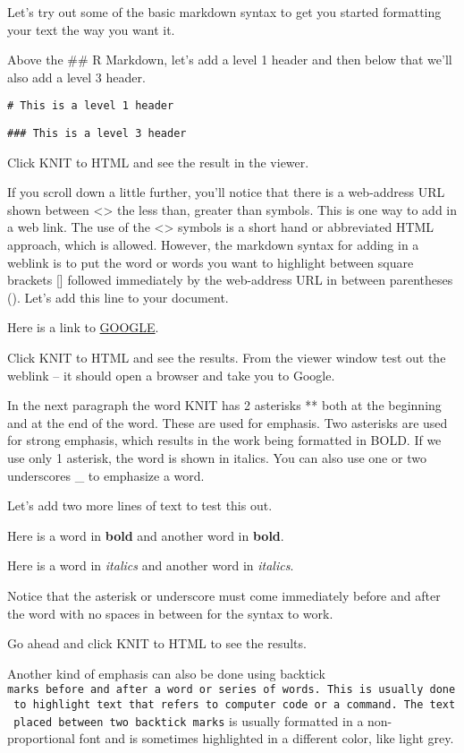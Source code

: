 \documentclass[]{book}
\theoremstyle{definition}
\theoremstyle{definition}
\theoremstyle{definition}
\theoremstyle{remark}
\begin{document}
Let's try out some of the basic markdown syntax to get you started
formatting your text the way you want it.

Above the \#\# R Markdown, let's add a level 1 header and then below
that we'll also add a level 3 header.

\texttt{\#\ This\ is\ a\ level\ 1\ header}

\texttt{\#\#\#\ This\ is\ a\ level\ 3\ header}

Click KNIT to HTML and see the result in the viewer.

If you scroll down a little further, you'll notice that there is a
web-address URL shown between \textless{}\textgreater{} the less than,
greater than symbols. This is one way to add in a web link. The use of
the \textless{}\textgreater{} symbols is a short hand or abbreviated
HTML approach, which is allowed. However, the markdown syntax for adding
in a weblink is to put the word or words you want to highlight between
square brackets {[}{]} followed immediately by the web-address URL in
between parentheses (). Let's add this line to your document.

Here is a link to \href{http://google.com}{GOOGLE}.

Click KNIT to HTML and see the results. From the viewer window test out
the weblink -- it should open a browser and take you to Google.

In the next paragraph the word KNIT has 2 asterisks ** both at the
beginning and at the end of the word. These are used for emphasis. Two
asterisks are used for strong emphasis, which results in the work being
formatted in BOLD. If we use only 1 asterisk, the word is shown in
italics. You can also use one or two underscores \_ to emphasize a word.

Let's add two more lines of text to test this out.

Here is a word in \textbf{bold} and another word in \textbf{bold}.

Here is a word in \emph{italics} and another word in \emph{italics}.

Notice that the asterisk or underscore must come immediately before and
after the word with no spaces in between for the syntax to work.

Go ahead and click KNIT to HTML to see the results.

Another kind of emphasis can also be done using backtick
\texttt{marks\ before\ and\ after\ a\ word\ or\ series\ of\ words.\ This\ is\ usually\ done\ to\ highlight\ text\ that\ refers\ to\ computer\ code\ or\ a\ command.\ The\ text\ placed\ between\ two\ backtick\ marks}
is usually formatted in a non-proportional font and is sometimes
highlighted in a different color, like light grey.
\end{document}
